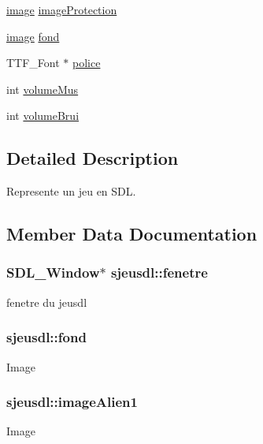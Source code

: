 \begin{DoxyCompactItemize}
\item 
\hyperlink{structsimage}{image} \hyperlink{structsjeusdl_a1bfac9bb34a0abd3e39c2002e693ae1f}{image\+Protection}
\item 
\hyperlink{structsimage}{image} \hyperlink{structsjeusdl_a9826f5ae82e2916b33e834fb725fa61a}{fond}
\item 
T\+T\+F\+\_\+\+Font $\ast$ \hyperlink{structsjeusdl_aaf97bfa71ccc7076ea1be9a2ff0b02af}{police}
\item 
int \hyperlink{structsjeusdl_a5406bc418f53a24a9cfc35cb36cd32c2}{volume\+Mus}
\item 
int \hyperlink{structsjeusdl_ac11351451a2de6ae145e4ec39918f1b9}{volume\+Brui}
\end{DoxyCompactItemize}


\subsection{Detailed Description}
Represente un jeu en S\+DL. 

\subsection{Member Data Documentation}
\subsubsection[{\texorpdfstring{fenetre}{fenetre}}]{\setlength{\rightskip}{0pt plus 5cm}S\+D\+L\+\_\+\+Window$\ast$ sjeusdl\+::fenetre}\hypertarget{structsjeusdl_add6855f14444a8af4bafb69710e191c2}{}\label{structsjeusdl_add6855f14444a8af4bafb69710e191c2}
fenetre du jeusdl 
\subsubsection[{\texorpdfstring{fond}{fond}}]{ sjeusdl\+::fond}\hypertarget{structsjeusdl_a9826f5ae82e2916b33e834fb725fa61a}{}\label{structsjeusdl_a9826f5ae82e2916b33e834fb725fa61a}
Image 
\subsubsection[{\texorpdfstring{image\+Alien1}{imageAlien1}}]{ sjeusdl\+::image\+Alien1}\hypertarget{structsjeusdl_ac9d0afe4881465ffcf132833fdbdb7aa}{}\label{structsjeusdl_ac9d0afe4881465ffcf132833fdbdb7aa}
Image 
